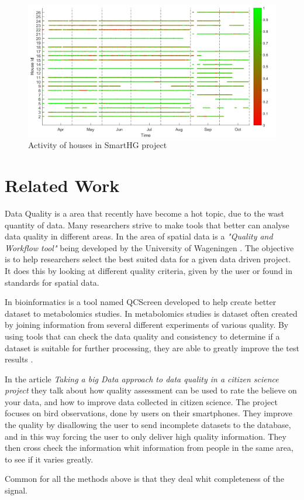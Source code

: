\begin{figure}[H]
\centering
\includegraphics[width=1\textwidth]{billeder/ActivityBig.png}
\caption{Activity of houses in SmartHG project}
\label{fig:ActivityMap}
\end{figure}

\section{Related Work}
Data Quality is a area that recently have become a hot topic, due to the wast quantity of data. Many researchers strive to make tools that better can analyse data quality in different areas. In the area of spatial data is a \emph{"Quality and Workflow tool"} being developed by the University of Wageningen \citep{RefWorks:8}. The objective is to help researchers select the best suited data for a given data driven project. It does this by looking at different quality criteria, given by the user or found in standards for spatial data. 

In bioinformatics is a tool named QCScreen developed to help create better dataset to metabolomics studies. In metabolomics studies is dataset often created by joining information from several different experiments of various quality. By using tools that can check the data quality and consistency to determine if a dataset is suitable for further processing, they are able to greatly improve the test results \citep{RefWorks:9}.
 
In the article \emph{Taking a big Data approach to data quality in a citizen science project}\citep{RefWorks:2} they talk about how quality assessment can be used to rate the 
believe on your data, and how to improve data collected in citizen science. The project focuses on bird observations, done by users on their smartphones. They improve the quality by disallowing the user to send incomplete datasets to the database, and in this way forcing the user to only deliver high quality information. They then cross check the information whit information from people in the same area, to see if it varies greatly. 

Common for all the methods above is that they deal whit completeness of the signal.